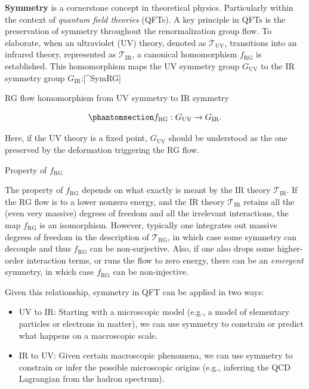 \documentclass[11pt,toc=bibliography]{scrbook}
\numberwithin{equation}{section}
\providecommand{\tightlist}{%
  \setlength{\itemsep}{0pt}\setlength{\parskip}{0pt}}
\begin{document}
\textbf{Symmetry} is a cornerstone concept in theoretical physics.
Particularly within the context of \emph{quantum field theories} (QFTs).
A key principle in QFTs is the preservation of symmetry throughout the
renormalization group flow. To elaborate, when an ultraviolet (UV)
theory, denoted as \(\mathcal{T}_\text{UV}\), transitions into an
infrared theory, represented as \(\mathcal{T}_\text{IR}\), a canonical
homomorphism \(f_\text{RG}\) is established. This homomorphism maps the
UV symmetry group \(G_\text{UV}\) to the IR symmetry group
\(G_\text{IR}\):{[}\^{}SymRG{]}

\begin{important}{RG flow homomorphism from UV symmetry to IR symmetry}

\begin{equation}\phantomsection\label{eq-RG-group-match}{
f_\text{RG} : G_\text{UV} \to G_\text{IR}.
}\end{equation}

\end{important}

Here, if the UV theory is a fixed point, \(G_\text{UV}\) should be
understood as the one preserved by the deformation triggering the RG
flow.

\begin{note}{Property of \(f_\text{RG}\)}

The property of \(f_\text{RG}\) depends on what exactly is meant by the
IR theory \(\mathcal{T}_\text{IR}\). If the RG flow is to a lower
nonzero energy, and the IR theory \(\mathcal{T}_\text{IR}\) retains all
the (even very massive) degrees of freedom and all the irrelevant
interactions, the map \(f_\text{RG}\) is an isomorphism. However,
typically one integrates out massive degrees of freedom in the
description of \(\mathcal{T}_\text{RG}\), in which case some symmetry
can decouple and thus \(f_\text{RG}\) can be non-surjective. Also, if
one also drops some higher-order interaction terms, or runs the flow to
zero energy, there can be an \emph{emergent} symmetry, in which case
\(f_\text{RG}\) can be non-injective.

\end{note}

Given this relationship, symmetry in QFT can be applied in two ways:

\begin{itemize}
\tightlist
\item
  UV to IR: Starting with a microscopic model (e.g., a model of
  elementary particles or electrons in matter), we can use symmetry to
  constrain or predict what happens on a macroscopic scale.
\item
  IR to UV: Given certain macroscopic phenomena, we can use symmetry to
  constrain or infer the possible microscopic origins (e.g., inferring
  the QCD Lagrangian from the hadron spectrum).
\end{itemize}
\end{document}
